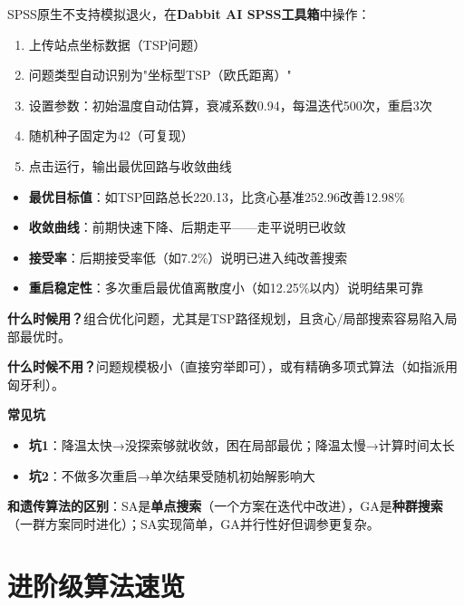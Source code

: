 \begin{algosposs}
SPSS原生不支持模拟退火，在\textbf{Dabbit AI SPSS工具箱}中操作：

\begin{enumerate}
    \item 上传站点坐标数据（TSP问题）
    \item 问题类型自动识别为"坐标型TSP（欧氏距离）"
    \item 设置参数：初始温度自动估算，衰减系数0.94，每温迭代500次，重启3次
    \item 随机种子固定为42（可复现）
    \item 点击运行，输出最优回路与收敛曲线
\end{enumerate}
\end{algosposs}

\begin{algoresult}
\begin{itemize}
    \item \textbf{最优目标值}：如TSP回路总长220.13，比贪心基准252.96改善12.98\%
    \item \textbf{收敛曲线}：前期快速下降、后期走平——走平说明已收敛
    \item \textbf{接受率}：后期接受率低（如7.2\%）说明已进入纯改善搜索
    \item \textbf{重启稳定性}：多次重启最优值离散度小（如12.25\%以内）说明结果可靠
\end{itemize}
\end{algoresult}

\begin{algonotes}
\textbf{什么时候用？}组合优化问题，尤其是TSP路径规划，且贪心/局部搜索容易陷入局部最优时。

\textbf{什么时候不用？}问题规模极小（直接穷举即可），或有精确多项式算法（如指派用匈牙利）。

\textbf{常见坑}
\begin{itemize}
    \item \textbf{坑1}：降温太快→没探索够就收敛，困在局部最优；降温太慢→计算时间太长
    \item \textbf{坑2}：不做多次重启→单次结果受随机初始解影响大
\end{itemize}

\textbf{和遗传算法的区别}：SA是\textbf{单点搜索}（一个方案在迭代中改进），GA是\textbf{种群搜索}（一群方案同时进化）；SA实现简单，GA并行性好但调参更复杂。
\end{algonotes}

\section{进阶级算法速览}

